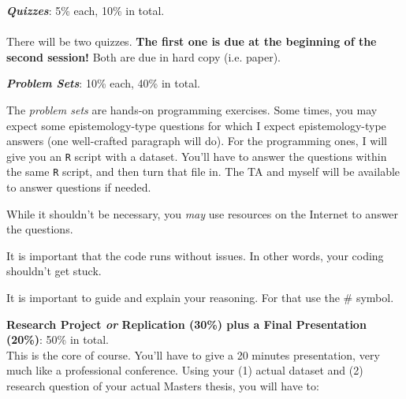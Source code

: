 \documentclass[letterpaper]{article}
\renewenvironment{itemize}{
  \begin{list}{}{
    \setlength{\leftmargin}{1.5em}
  }
}{
  \end{list}
}
\begin{document}
\begin{enumerate}

	\item {\bf \emph{Quizzes}}: 5\% each, 10\% in total.
	\\
  \\
   There will be two quizzes. {\bf The first one is due at the beginning of the second session!} Both are due in hard copy (i.e. paper). 

	\item {\bf \emph{Problem Sets}}: 10\% each, 40\% in total.

The \emph{problem sets} are hands-on programming exercises. Some times, you may expect some epistemology-type questions for which I expect epistemology-type answers (one well-crafted paragraph will do). For the programming ones, I will give you an \texttt{R} script with a dataset. You'll have to answer the questions within the same \texttt{R} script, and then turn that file in. The TA and myself will be available to answer questions if needed. 

\begin{itemize}
		\item[$\diamond$] While it shouldn't be necessary, you \emph{may} use resources on the Internet to answer the questions.
		\item[$\diamond$] It is important that the code runs without issues. In other words, your coding shouldn't get stuck.
		\item[$\diamond$] It is important to guide and explain your reasoning. For that use the \# symbol.
\end{itemize}


\item {\bf Research Project \emph{or} Replication (30\%) plus a Final Presentation (20\%)}: 50\% in total.\\

This is the core of course. You'll have to give a 20 minutes presentation, very much like a professional conference. Using your (1) actual dataset and (2) research question of your actual Masters thesis, you will have to:

\begin{itemize}


\end{itemize}
\end{enumerate}
\end{document}
